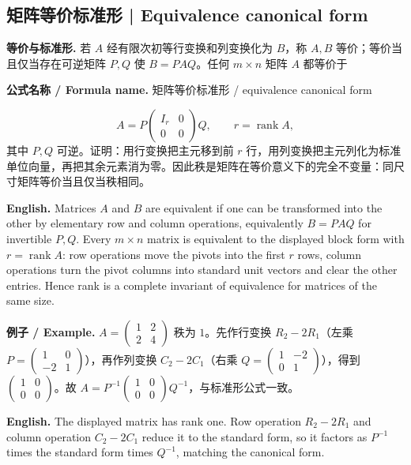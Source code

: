 \documentclass[UTF8,11pt,a4paper]{ctexart}
\newcommand{\EN}[1]{\par\noindent\textbf{English.} #1\par}
\newcommand{\FORMULA}[2]{\par\noindent\textbf{公式名称 / Formula name.} #1 / #2\par}
\newcommand{\EX}[2]{\par\noindent\textbf{例子 / Example.} #1\par\EN{#2}}
\begin{document}
\subsection{矩阵等价标准形 | Equivalence canonical form}
\noindent\textbf{等价与标准形.} 若 $A$ 经有限次初等行变换和列变换化为 $B$，称 $A,B$ 等价；等价当且仅当存在可逆矩阵 $P,Q$ 使 $B=PAQ$。任何 $m\times n$ 矩阵 $A$ 都等价于
\FORMULA{矩阵等价标准形}{equivalence canonical form}
\[
A=P\begin{pmatrix}I_r&0\\0&0\end{pmatrix}Q,\qquad r=\operatorname{rank}A,
\]
其中 $P,Q$ 可逆。证明：用行变换把主元移到前 $r$ 行，用列变换把主元列化为标准单位向量，再把其余元素消为零。因此秩是矩阵在等价意义下的完全不变量：同尺寸矩阵等价当且仅当秩相同。
\EN{Matrices $A$ and $B$ are equivalent if one can be transformed into the other by elementary row and column operations, equivalently $B=PAQ$ for invertible $P,Q$. Every $m\times n$ matrix is equivalent to the displayed block form with $r=\operatorname{rank}A$: row operations move the pivots into the first $r$ rows, column operations turn the pivot columns into standard unit vectors and clear the other entries. Hence rank is a complete invariant of equivalence for matrices of the same size.}
\EX{$A=\begin{pmatrix}1&2\\2&4\end{pmatrix}$ 秩为 $1$。先作行变换 $R_2-2R_1$（左乘 $P=\begin{pmatrix}1&0\\-2&1\end{pmatrix}$），再作列变换 $C_2-2C_1$（右乘 $Q=\begin{pmatrix}1&-2\\0&1\end{pmatrix}$），得到 $\begin{pmatrix}1&0\\0&0\end{pmatrix}$。故 $A=P^{-1}\begin{pmatrix}1&0\\0&0\end{pmatrix}Q^{-1}$，与标准形公式一致。}{The displayed matrix has rank one. Row operation $R_2-2R_1$ and column operation $C_2-2C_1$ reduce it to the standard form, so it factors as $P^{-1}$ times the standard form times $Q^{-1}$, matching the canonical form.}
\end{document}

